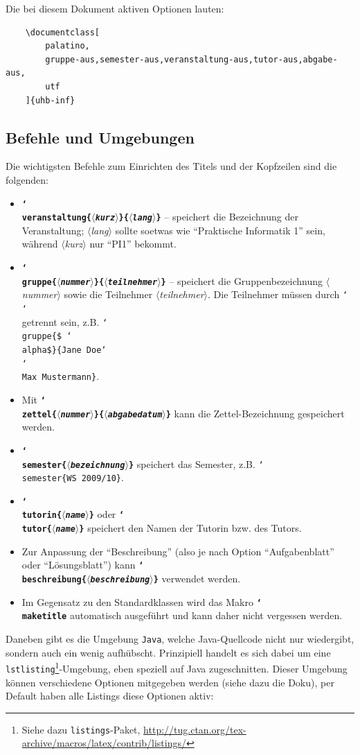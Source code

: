 \documentclass[palatino,gruppe-aus,semester-aus,veranstaltung-aus,abgabe-aus,tutor-aus,utf]{uhb-inf}
\def\option#1{\texttt{\bfseries #1}}
\def\cs#1{\char`\\#1}
\def\p#1{$\langle$\textit{#1}$\rangle$}
\def\pb#1{\{\p{#1}\}}
\begin{document}
\newpage

Die bei diesem Dokument aktiven Optionen lauten:

\begin{verbatim}
    \documentclass[
        palatino,
        gruppe-aus,semester-aus,veranstaltung-aus,tutor-aus,abgabe-aus,
        utf
    ]{uhb-inf}
\end{verbatim}

\subsection{Befehle und Umgebungen}

Die wichtigsten Befehle zum Einrichten des Titels und der Kopfzeilen sind die folgenden:

\begin{itemize}
	\item \option{\cs{veranstaltung}\pb{kurz}\pb{lang}} -- speichert die Bezeichnung der Veranstaltung; \p{lang} sollte soetwas wie "`Praktische Informatik 1"' sein, während \p{kurz} nur "`PI1"' bekommt.
	\item \option{\cs{gruppe}\pb{nummer}\pb{teilnehmer}} -- speichert die Gruppenbezeichnung \p{nummer} sowie die Teilnehmer \p{teilnehmer}. Die Teilnehmer müssen durch \texttt{\cs\cs{}} getrennt sein, z.B. \texttt{\cs{gruppe}\{\$ \cs{alpha}\$\}\{Jane Doe\cs\cs{}Max Mustermann\}}.
	\item Mit \option{\cs{zettel}\pb{nummer}\pb{abgabedatum}} kann die Zettel-Bezeichnung gespeichert werden.
	\item \option{\cs{semester}\pb{bezeichnung}} speichert das Semester, z.B. \texttt{\cs{semester}\{WS 2009/10\}}.
	\item \option{\cs{tutorin}\pb{name}} oder \option{\cs{tutor}\pb{name}} speichert den Namen der Tutorin bzw. des Tutors.
	\item Zur Anpassung der "`Beschreibung"' (also je nach Option "`Aufgabenblatt"' oder "`Lösungsblatt"') kann \option{\cs{beschreibung}\pb{beschreibung}} verwendet werden.
	\item Im Gegensatz zu den Standardklassen wird das Makro \option{\cs{maketitle}} automatisch ausgeführt und kann daher nicht vergessen werden.
\end{itemize}

Daneben gibt es die Umgebung \texttt{Java}, welche Java-Quellcode nicht nur wiedergibt, sondern auch ein wenig aufhübscht. Prinzipiell handelt es sich dabei um eine \texttt{lstlisting}\footnote{Siehe dazu \texttt{listings}-Paket, \url{http://tug.ctan.org/tex-archive/macros/latex/contrib/listings/}}-Umgebung, eben speziell auf Java zugeschnitten. Dieser Umgebung können verschiedene Optionen mitgegeben werden (siehe dazu die Doku), per Default haben alle Listings diese Optionen aktiv:
\end{document}
